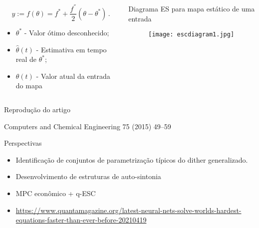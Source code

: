 \documentclass{beamer}
\begin{document}
\begin{frame}
\begin{columns}
	\begin{column}{5cm}
\begin{block}{}
\begin{equation}
\label{eq:esc_e}
y:= f(\theta) = f^{\ast} + \frac{f^{''}}{2}(\theta - \theta^{\ast})\,.
\end{equation}
\end{block}
\begin{block}{}
\begin{itemize}
\item $\theta^{\ast}$ - Valor ótimo desconhecido;
\item $\hat{\theta}(t)$ - Estimativa em tempo real de $\theta^{\ast}$;
\item $\theta(t)$ - Valor atual da entrada do mapa
\end{itemize}
\end{block}
\end{column}
	\begin{column}{5cm}
	\begin{block}{Diagrama ES para mapa estático de uma entrada}
\begin{figure}[ht]
\begin{center}
\texttt{[image: escdiagram1.jpg]}
\label{escdiagram1}
\end{center}
\end{figure}
        \end{block}
\end{column}
\end{columns}
\end{frame}

\begin{frame}{Reprodução do artigo}
	\begin{block}{Computers and Chemical Engineering 75 (2015) 49–59}
          
	\end{block}
\end{frame}

\begin{frame}{Perspectivas}

\begin{itemize}
\item Identificação de conjuntos de parametrização típicos do dither generalizado. 
\item Desenvolvimento de estruturas de auto-sintonia
\item MPC econômico + q-ESC 
\item \href{DeepONet}{https://www.quantamagazine.org/latest-neural-nets-solve-worlds-hardest-equations-faster-than-ever-before-20210419} 
\end{itemize}

\end{frame}
\end{document}
